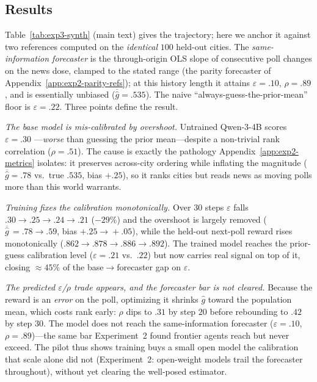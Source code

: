 \documentclass{article} %
\begin{document}
\subsection{Results}
\label{app:exp3-results}

Table~\ref{tab:exp3-synth} (main text) gives the trajectory; here we anchor it against two references
computed on the \emph{identical} $100$ held-out cities.  The \emph{same-information forecaster} is the
through-origin OLS slope of consecutive poll changes on the news dose, clamped to the stated range
(the parity forecaster of Appendix~\ref{app:exp2-parity-refs}); at this history length it attains
$\varepsilon{=}.10$, $\rho{=}.89$, and is essentially unbiased ($\overline{\hat g}{=}.535$).  The
naive ``always-guess-the-prior-mean'' floor is $\varepsilon{=}.22$.  Three points define the result.

\emph{The base model is mis-calibrated by overshoot.}  Untrained Qwen-3-4B scores $\varepsilon{=}.30$
---\emph{worse} than guessing the prior mean---despite a non-trivial rank correlation
($\rho{=}.51$).  The cause is exactly the pathology Appendix~\ref{app:exp2-metrics} isolates: it
preserves across-city ordering while inflating the magnitude ($\overline{\hat g}{=}.78$ vs.\ true
$.535$, bias $+.25$), so it ranks cities but reads news as moving polls more than this world warrants.

\emph{Training fixes the calibration monotonically.}  Over $30$ steps $\varepsilon$ falls
$.30\!\to\!.25\!\to\!.24\!\to\!.21$ ($-29\%$) and the overshoot is largely removed
($\overline{\hat g}\,{=}.78\!\to\!.59$, bias $+.25\!\to\!+.05$), while the held-out next-poll reward
rises monotonically ($.862\!\to\!.878\!\to\!.886\!\to\!.892$).  The trained model reaches the
prior-guess calibration level ($\varepsilon{=}.21$ vs.\ $.22$) but now carries real signal on top of
it, closing $\approx45\%$ of the base$\to$forecaster gap on $\varepsilon$.

\emph{The predicted $\varepsilon$/$\rho$ trade appears, and the forecaster bar is not cleared.}  Because
the reward is an \emph{error} on the poll, optimizing it shrinks $\hat g$ toward the population mean,
which costs rank early: $\rho$ dips to $.31$ by step $20$ before rebounding to $.42$ by step $30$.  The
model does not reach the same-information forecaster ($\varepsilon{=}.10$, $\rho{=}.89$)---the same bar
Experiment~2 found frontier agents reach but never exceed.  The pilot thus shows training buys a small
open model the calibration that scale alone did not (Experiment~2: open-weight models trail the
forecaster throughout), without yet clearing the well-posed estimator.
\end{document}
